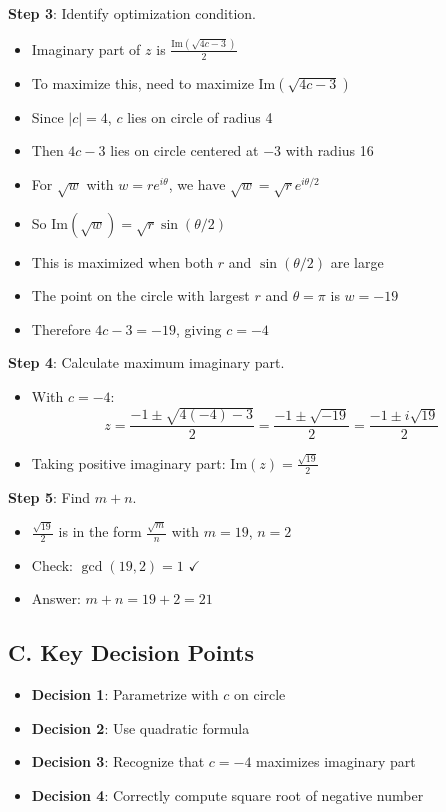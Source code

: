 \documentclass[11pt]{article}
\begin{document}
\begin{roadmapbox}
\textbf{Step 3}: Identify optimization condition.
\begin{itemize}
    \item Imaginary part of $z$ is $\frac{\text{Im}(\sqrt{4c-3})}{2}$
    \item To maximize this, need to maximize $\text{Im}(\sqrt{4c-3})$
    \item Since $|c| = 4$, $c$ lies on circle of radius 4
    \item Then $4c-3$ lies on circle centered at $-3$ with radius 16
    \item For $\sqrt{w}$ with $w = re^{i\theta}$, we have $\sqrt{w} = \sqrt{r}e^{i\theta/2}$
    \item So $\text{Im}(\sqrt{w}) = \sqrt{r}\sin(\theta/2)$
    \item This is maximized when both $r$ and $\sin(\theta/2)$ are large
    \item The point on the circle with largest $r$ and $\theta = \pi$ is $w = -19$
    \item Therefore $4c - 3 = -19$, giving $c = -4$
\end{itemize}

\textbf{Step 4}: Calculate maximum imaginary part.
\begin{itemize}
    \item With $c = -4$:
    \[z = \frac{-1 \pm \sqrt{4(-4)-3}}{2} = \frac{-1 \pm \sqrt{-19}}{2} = \frac{-1 \pm i\sqrt{19}}{2}\]
    \item Taking positive imaginary part: $\text{Im}(z) = \frac{\sqrt{19}}{2}$
\end{itemize}

\textbf{Step 5}: Find $m + n$.
\begin{itemize}
    \item $\frac{\sqrt{19}}{2}$ is in the form $\frac{\sqrt{m}}{n}$ with $m = 19$, $n = 2$
    \item Check: $\gcd(19, 2) = 1$ $\checkmark$
    \item Answer: $m + n = 19 + 2 = 21$
\end{itemize}

\subsection*{C. Key Decision Points}
\begin{itemize}[leftmargin=*]
    \item \textbf{Decision 1}: Parametrize with $c$ on circle
    \item \textbf{Decision 2}: Use quadratic formula
    \item \textbf{Decision 3}: Recognize that $c = -4$ maximizes imaginary part
    \item \textbf{Decision 4}: Correctly compute square root of negative number
\end{itemize}


\end{roadmapbox}
\end{document}
